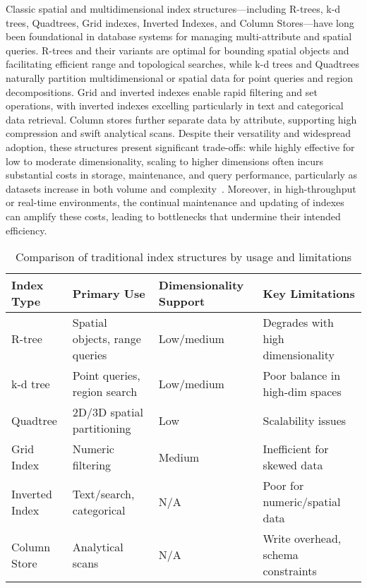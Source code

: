 \documentclass[sigconf]{acmart}
\begin{document}
Classic spatial and multidimensional index structures—including R-trees, k-d trees, Quadtrees, Grid indexes, Inverted Indexes, and Column Stores—have long been foundational in database systems for managing multi-attribute and spatial queries. R-trees and their variants are optimal for bounding spatial objects and facilitating efficient range and topological searches, while k-d trees and Quadtrees naturally partition multidimensional or spatial data for point queries and region decompositions. Grid and inverted indexes enable rapid filtering and set operations, with inverted indexes excelling particularly in text and categorical data retrieval. Column stores further separate data by attribute, supporting high compression and swift analytical scans. Despite their versatility and widespread adoption, these structures present significant trade-offs: while highly effective for low to moderate dimensionality, scaling to higher dimensions often incurs substantial costs in storage, maintenance, and query performance, particularly as datasets increase in both volume and complexity~\cite{ref111,ref112}. Moreover, in high-throughput or real-time environments, the continual maintenance and updating of indexes can amplify these costs, leading to bottlenecks that undermine their intended efficiency.

\begin{table*}[htbp]
\centering
\caption{Comparison of traditional index structures by usage and limitations}
\label{tab:traditional_indexes}
\begin{adjustbox}{max width=\textwidth}
\begin{tabular}{llll}
\toprule
\textbf{Index Type} & \textbf{Primary Use} & \textbf{Dimensionality Support} & \textbf{Key Limitations} \\
\midrule
R-tree & Spatial objects, range queries & Low/medium & Degrades with high dimensionality \\
k-d tree & Point queries, region search & Low/medium & Poor balance in high-dim spaces \\
Quadtree & 2D/3D spatial partitioning & Low & Scalability issues \\
Grid Index & Numeric filtering & Medium & Inefficient for skewed data \\
Inverted Index & Text/search, categorical & N/A & Poor for numeric/spatial data \\
Column Store & Analytical scans & N/A & Write overhead, schema constraints \\
\bottomrule
\end{tabular}
\end{adjustbox}
\end{table*}
\end{document}
